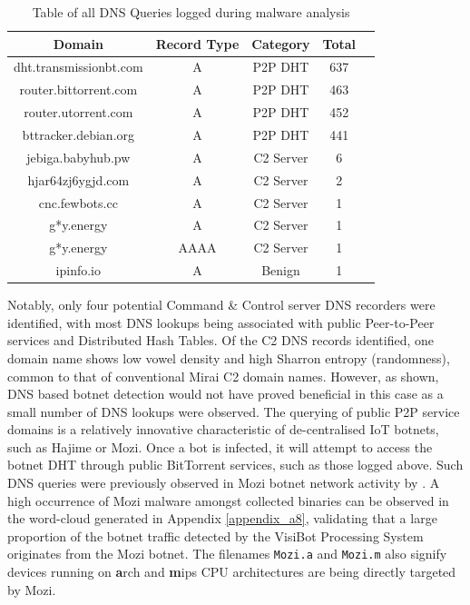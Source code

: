 \begin{table}[!htb]
    \centering
    \caption{Table of all DNS Queries logged during malware analysis}
    \label{tab:dns_queries}
    \begin{tabular}{|c|c|c|c|c|}
    \hline
    \textbf{Domain} & \textbf{Record Type} & \textbf{Category} & \textbf{Total} \\ \hline
    dht.transmissionbt.com & A    & P2P DHT & 637 \\ \hline
    router.bittorrent.com  & A    & P2P DHT &  463 \\ \hline
    router.utorrent.com    & A    & P2P DHT &  452 \\ \hline
    bttracker.debian.org   & A    & P2P DHT &  441 \\ \hline
    jebiga.babyhub.pw      & A    & C2 Server &  6 \\ \hline
    hjar64zj6ygjd.com      & A    & C2 Server  &  2 \\ \hline
    cnc.fewbots.cc         & A    & C2 Server  &  1 \\ \hline
    g*y.energy             & A    & C2 Server  &  1 \\ \hline
    g*y.energy             & AAAA & C2 Server  &  1 \\ \hline
    ipinfo.io              & A    & Benign &  1 \\ \hline
    \end{tabular}
\end{table}

Notably, only four potential Command \& Control server DNS recorders were identified, with most DNS lookups being associated with public Peer-to-Peer services and Distributed Hash Tables. Of the C2 DNS records identified, one domain name shows low vowel density and high Sharron entropy (randomness), common to that of conventional Mirai C2 domain names. \citet{Dwyer2019} However, as shown,  DNS based botnet detection would not have proved beneficial in this case as a small number of DNS lookups were observed. The querying of public P2P service domains is a relatively innovative characteristic of de-centralised IoT botnets, such as Hajime or Mozi. Once a bot is infected, it will attempt to access the botnet DHT through public BitTorrent services, such as those logged above. Such DNS queries were previously observed in Mozi botnet network activity by \citep{Netlab2019}. A high occurrence of Mozi malware amongst collected binaries can be observed in the word-cloud generated in Appendix \ref{appendix_a8}, validating that a large proportion of the botnet traffic detected by the VisiBot Processing System originates from the Mozi botnet. The filenames \texttt{Mozi.a} and \texttt{Mozi.m} also signify devices running on \textbf{a}rch and \textbf{m}ips CPU architectures are being directly targeted by Mozi. 

